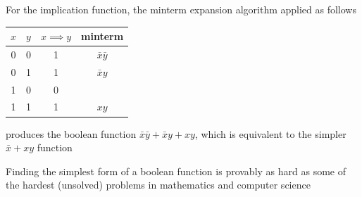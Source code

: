 \documentclass[8pt,a4paper,compress]{beamer}
\begin{document}
\begin{frame}[fragile]
\pause

For the implication function, the minterm expansion algorithm applied as follows 

\begin{center}
\begin{tabular}{cc|c|c}
$x$ & $y$ & $x \implies y$ & minterm \\ \hline
0 & 0 & 1 & $\bar{x}\bar{y}$ \\
0 & 1 & 1 & $\bar{x}y$ \\
\color{lightgray}1 & \color{lightgray}0 & \color{lightgray}0 & \\
1 & 1 & 1 & $xy$
\end{tabular}
\end{center}

produces the boolean function $\bar{x}\bar{y}+\bar{x}y+xy$, which is equivalent to the simpler $\bar{x}+xy$ function

\pause
\bigskip

Finding the simplest form of a boolean function is provably as hard as some of the hardest (unsolved) problems in mathematics and computer science
\end{frame}
\end{document}
